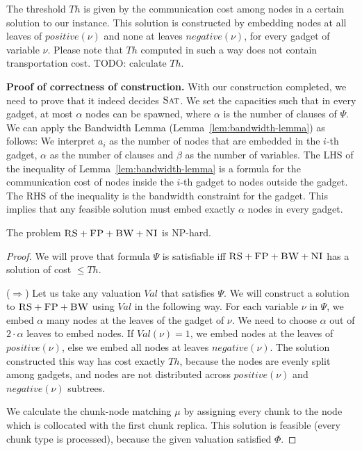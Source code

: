 \documentclass[9pt,twocolumn]{scrartcl}
\newcommand{\variab}{\nu}
\newcommand{\clauses}{\alpha}
\newcommand{\variables}{\beta}
\newcommand{\CC}{\textsc{NI}}
\newcommand{\FP}{\textsc{FP}}
\newcommand{\RS}{\textsc{RS}}
\newcommand{\BW}{\textsc{BW}}
\newcommand{\SAT}{\textsc{Sat}}
\newcommand{\Formula}{\ensuremath{\Psi}}
\newcommand{\Thr}{\ensuremath{Th}}
\newcommand{\positive}{\ensuremath{positive}}
\newcommand{\negative}{\ensuremath{negative}}
\newcommand{\Val}{\ensuremath{Val}}
\begin{document}
\begin{appendix}
The threshold $\Thr$ is given by the
communication cost among nodes in
a certain solution to our instance. This solution is constructed by embedding
nodes at all leaves of $\positive(\variab)$ and none at leaves
$\negative(\variab)$, for every gadget of variable $\variab$. Please note that $\Thr$
computed in such a way does not contain transportation cost. TODO: calculate
$\Thr$.

\textbf{Proof of correctness of construction.}
With our construction completed, we need to prove that it indeed
decides $\SAT$. We set the capacities such that in every gadget,
at most $\clauses$ nodes can be spawned, where $\clauses$
is the number of clauses of $\Formula$.
We can apply the Bandwidth Lemma (Lemma~\ref{lem:bandwidth-lemma}) as follows:
We interpret $a_i$ as the
number of nodes that are embedded in the $i$-th gadget, $\clauses$
as the number
of clauses and $\variables$ as the number of variables.
The LHS of the inequality of Lemma~\ref{lem:bandwidth-lemma}
is a formula for the communication cost of nodes inside the $i$-th
gadget to nodes outside the gadget. The RHS of the inequality is the
bandwidth constraint for the gadget. This implies that
any feasible solution must embed exactly $\clauses$ nodes in every gadget.


\begin{theorem}
The problem $\RS+\FP+\BW+\CC$ is NP-hard.
\end{theorem}
\begin{proof}
We will prove that formula $\Formula$ is satisfiable iff $\RS+\FP+\BW+\CC$ has
a solution of cost $\leq \Thr$.

($\Rightarrow$) Let us take any valuation $\Val$ that satisfies $\Formula$.
We will construct a solution to $\RS+\FP+\BW$ using $\Val$ in the following way.
For each variable $\variab$ in $\Formula$, we embed $\clauses$ many nodes
at the  leaves of the gadget of $\variab$. We need to choose $\clauses$ out of
$2 \cdot \clauses$ leaves to embed nodes. If $\Val(\variab) = 1$, we embed
nodes at the leaves
of $\positive(\variab)$, else we embed all nodes at leaves $\negative(\variab)$.
The solution constructed this way has cost exactly
$\Thr$, because the nodes are evenly split among gadgets, and nodes are not
distributed across $\positive(\variab)$ and $\negative(\variab)$ subtrees.

We calculate the chunk-node matching $\mu$ by assigning every chunk to
the node which is collocated with the first chunk replica. This solution is feasible
(every chunk type is processed),
because the given valuation satisfied $\Phi$.


\end{proof}
\end{appendix}
\end{document}
